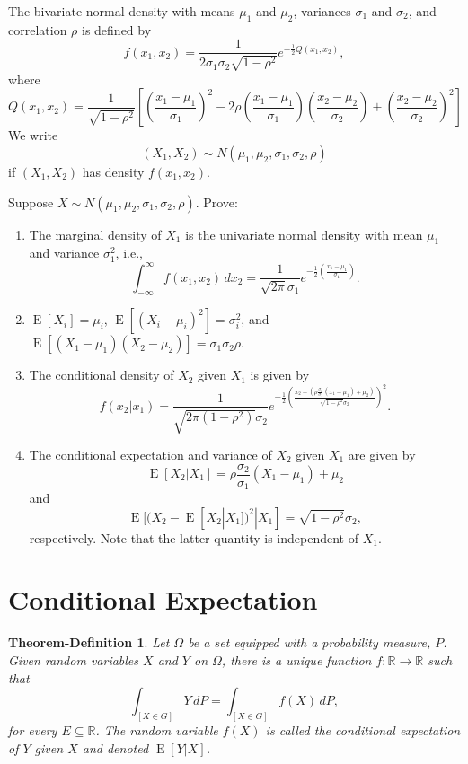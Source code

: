 \documentclass[12pt]{amsart}
\newcommand{\RR}{\mathbb{R}}
\DeclareMathOperator{\EE}{E}
\newtheorem{thmdef}[theorem]{Theorem-Definition}
\begin{document}
The bivariate normal density with means $\mu_1$ and $\mu_2$, variances $\sigma_1$ and $\sigma_2$,
and correlation $\rho$ is defined by
\[
f(x_1, x_2) 
= \frac1{2\sigma_1\sigma_2\sqrt{1-\rho^2}}e^{-\frac1{2}Q(x_1, x_2)},
\]
where
\[
    Q(x_1,x_2) = \frac1{\sqrt{1-\rho^2}}\left[
    \left(\frac{x_1-\mu_1}{\sigma_1}\right)^2
    - 2\rho \left(\frac{x_1-\mu_1}{\sigma_1}\right)\left(\frac{x_2-\mu_2}{\sigma_2}\right)
    + \left(\frac{x_2-\mu_2}{\sigma_2}\right)^2\right]
\]
We write
\[
    (X_1,X_2)\sim N(\mu_1, \mu_2, \sigma_1, \sigma_2, \rho)
\]
if $(X_1,X_2)$ has density $f(x_1,x_2)$. 

Suppose $X\sim N(\mu_1, \mu_2, \sigma_1, \sigma_2, \rho)$. Prove:
\begin{enumerate}
    \setlength{\itemsep}{1em}
    \item The marginal density of $X_1$ is the univariate normal density with mean $\mu_1$ 
    and variance $\sigma_1^2$, i.e.,
    $$\int_{-\infty}^\infty f(x_1,x_2)\,dx_2 = \frac1{\sqrt{2\pi}\sigma_1}
    e^{-\frac12\left(\frac{x_1-\mu_1}{\sigma_1}\right)}.$$
    \item $\EE[X_i]=\mu_i$, $\EE[(X_i - \mu_i)^2]=\sigma_i^2$, and 
    $\EE[(X_1-\mu_1)(X_2-\mu_2)]=\sigma_1\sigma_2\rho$.
    \item The conditional density of $X_2$ given $X_1$ is given by
    $$
    f(x_2|x_1) = \frac1{\sqrt{2\pi(1-\rho^2)}\sigma_2}e^{-\frac12\left(\frac{x_2-\left(\rho\frac{\sigma_2}{\sigma_1}(x_1-\mu_1) + \mu_2\right)}{\sqrt{1-\rho^2}\sigma_2}\right)^2}.
    $$
\item The conditional expectation and variance of $X_2$ given $X_1$ are given by
    $$
    \EE[X_2|X_1] = \rho\frac{\sigma_2}{\sigma_1}(X_1-\mu_1) + \mu_2
    $$
    and
    $$
    \EE[(X_2 - \EE[X_2|X_1])^2|X_1] = \sqrt{1-\rho^2}\sigma_2,
    $$
    respectively.
    Note that the latter quantity is independent of $X_1$.
\end{enumerate}

\section{Conditional Expectation}
\begin{thmdef}
Let $\Omega$ be a set equipped with a probability measure, $P$.
Given random variables $X$ and $Y$ on $\Omega$, there is a unique function
$f:\RR\to\RR$ such that
\[
    \int_{[X\in G]}Y\,dP = \int_{[X\in G]}f(X)\,dP,
\]
for every $E\subseteq \RR$. The random variable $f(X)$ is called the
\emph{conditional expectation of $Y$ given $X$} and denoted $\EE[Y|X]$.
\end{thmdef}
\end{document}
